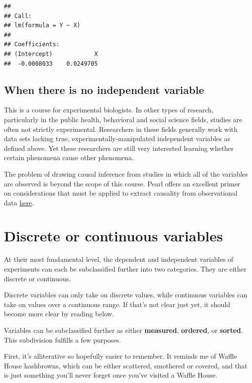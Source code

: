 \documentclass[]{book}
\begin{document}
\begin{verbatim}
## 
## Call:
## lm(formula = Y ~ X)
## 
## Coefficients:
## (Intercept)            X  
##  -0.0008033    0.0249705
\end{verbatim}

\hypertarget{when-there-is-no-independent-variable}{%
\subsection{When there is no independent variable}\label{when-there-is-no-independent-variable}}

This is a course for experimental biologists. In other types of research, particularly in the public health, behavioral and social science fields, studies are often not strictly experimental. Researchers in these fields generally work with data sets lacking true, experimentally-manipulated independent variables as defined above. Yet these researchers are still very interested learning whether certain phenomena cause other phenomena.

The problem of drawing causal inference from studies in which all of the variables are observed is beyond the scope of this course. Pearl offers an excellent primer on considerations that must be applied to extract causality from observational data \href{http://ftp.cs.ucla.edu/pub/stat_ser/r350.pdf}{here}.

\hypertarget{discrete-or-continuous-variables}{%
\section{Discrete or continuous variables}\label{discrete-or-continuous-variables}}

At their most fundamental level, the dependent and independent variables of experiments can each be subclassified further into two categories. They are either discrete or continuous.

Discrete variables can only take on discrete values, while continuous variables can take on values over a continuous range. If that's not clear just yet, it should become more clear by reading below.

Variables can be subclassified further as either \textbf{measured}, \textbf{ordered}, or \textbf{sorted}. This subdivision fulfills a few purposes.

First, it's alliterative so hopefully easier to remember. It reminds me of Waffle House hashbrowns, which can be either scattered, smothered or covered, and that is just something you'll never forget once you've visited a Waffle House.
\end{document}
